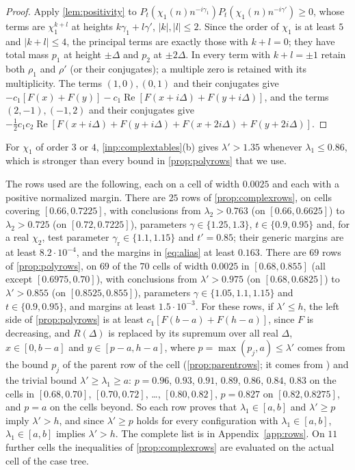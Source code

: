 \documentclass[11pt]{amsart}
\numberwithin{equation}{section}
\theoremstyle{plain}
\theoremstyle{definition}
\theoremstyle{remark}
\renewcommand{\Re}{\operatorname{Re}}
\newcommand{\1}{\mathbf{1}}
\begin{document}
\begin{proof}
Apply \cref{lem:positivity} to $P_t(\chi_1(n)n^{-i\gamma_1})P_t(\chi_1(n)n^{-i\gamma'})\ge0$, whose terms are
$\chi_1^{k+l}$ at heights $k\gamma_1+l\gamma'$, $|k|,|l|\le2$. Since the order of $\chi_1$ is at least $5$ and
$|k+l|\le4$, the principal terms are exactly those with $k+l=0$; they have total mass $p_1$ at height
$\pm\Delta$ and $p_2$ at $\pm2\Delta$. In every term with $k+l=\pm1$ retain both $\rho_1$ and $\rho'$ (or their
conjugates); a multiple zero is retained with its multiplicity. The terms $(1,0),(0,1)$ and their
conjugates give $-c_1[F(x)+F(y)]-c_1\Re[F(x+i\Delta)+F(y+i\Delta)]$, and the terms $(2,-1),(-1,2)$ and their
conjugates give $-\frac12c_1c_2\Re[F(x+i\Delta)+F(y+i\Delta)+F(x+2i\Delta)+F(y+2i\Delta)]$.
\end{proof}

For $\chi_1$ of order $3$ or $4$, \cref{inp:complextables}(b) gives $\lambda'>1.35$ whenever
$\lambda_1\le0.86$, which is stronger than every bound in \cref{prop:polyrows} that we use.

The rows used are the following, each on a cell of width $0.0025$ and each with a positive
normalized margin. There are $25$ rows of \cref{prop:complexrows}, on cells covering
$[0.66,0.7225]$, with conclusions from $\lambda_2>0.763$ (on $[0.66,0.6625]$) to $\lambda_2>0.725$ (on
$[0.72,0.7225]$), parameters $\gamma\in\{1.25,1.3\}$, $t\in\{0.9,0.95\}$ and, for a real $\chi_2$,
test parameter $\gamma_{\mathrm r}\in\{1.1,1.15\}$ and $t'=0.85$; their generic margins are at least $8.2\cdot10^{-4}$, and the margins
in \eqref{eq:alias} at least $0.163$. There are $69$ rows of \cref{prop:polyrows}, on $69$ of the $70$ cells of width $0.0025$ in
$[0.68,0.855]$ (all except $[0.6975,0.70]$), with conclusions from $\lambda'>0.975$ (on $[0.68,0.6825]$) to $\lambda'>0.855$ (on
$[0.8525,0.855]$), parameters $\gamma\in\{1.05,1.1,1.15\}$ and $t\in\{0.9,0.95\}$, and margins at least
$1.5\cdot10^{-3}$. For these rows, if $\lambda'\le h$, the left side of \cref{prop:polyrows} is at least
$c_1[F(b-a)+F(h-a)]$, since $F$ is decreasing, and $R(\Delta)$ is replaced by its supremum over all real
$\Delta$, $x\in[0,b-a]$ and $y\in[p-a,h-a]$, where $p=\max(p_j,a)\le\lambda'$ comes from the bound $p_j$ of the
parent row of the cell (\cref{prop:parentrows}; it comes from \cite[Table~$2'$]{Xylouris2011nullstellen}) and the
trivial bound $\lambda'\ge\lambda_1\ge a$: $p=0.96$, $0.93$, $0.91$, $0.89$, $0.86$, $0.84$, $0.83$ on the cells in $[0.68,0.70]$,
$[0.70,0.72]$, \dots, $[0.80,0.82]$, $p=0.827$ on $[0.82,0.8275]$, and $p=a$ on the cells beyond. So each row proves
that $\lambda_1\in[a,b]$ and $\lambda'\ge p$ imply $\lambda'>h$, and since $\lambda'\ge p$ holds for every configuration
with $\lambda_1\in[a,b]$, $\lambda_1\in[a,b]$ implies $\lambda'>h$. The complete list is in Appendix~\ref{app:rows}. On $11$ further cells the inequalities of
\cref{prop:complexrows} are evaluated on the actual cell of the case tree.
\end{document}
